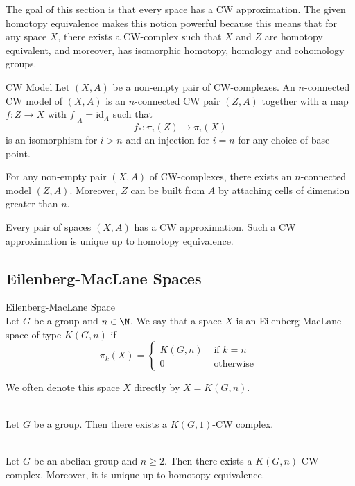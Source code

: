 \documentclass[a4paper]{article}
\begin{document}
The goal of this section is that every space has a CW approximation. The given homotopy equivalence makes this notion powerful because this means that for any space $X$, there exists a CW-complex such that $X$ and $Z$ are homotopy equivalent, and moreover, has isomorphic homotopy, homology and cohomology groups. 

\begin{defn}{CW Model}{} Let $(X,A)$ be a non-empty pair of CW-complexes. An $n$-connected CW model of $(X,A)$ is an $n$-connected CW pair $(Z,A)$ together with a map $f:Z\to X$ with $f|_A=\text{id}_A$ such that $$f_\ast:\pi_i(Z)\to\pi_i(X)$$ is an isomorphism for $i>n$ and an injection for $i=n$ for any choice of base point. 
\end{defn}

\begin{thm}{}{} For any non-empty pair $(X,A)$ of CW-complexes, there exists an $n$-connected model $(Z,A)$. Moreover, $Z$ can be built from $A$ by attaching cells of dimension greater than $n$. 
\end{thm}

\begin{thm}{}{} Every pair of spaces $(X,A)$ has a CW approximation. Such a CW approximation is unique up to homotopy equivalence. 
\end{thm}

\subsection{Eilenberg-MacLane Spaces}
\begin{defn}{Eilenberg-MacLane Space}{}\\
Let $G$ be a group and $n\in\N$. We say that a space $X$ is an Eilenberg-MacLane space of type $K(G,n)$ if $$\pi_k(X)=\begin{cases}
K(G,n) & \text{ if } k=n\\
0 & \text{ otherwise }
\end{cases}$$
\end{defn}

We often denote this space $X$ directly by $X=K(G,n)$. 

\begin{prp}{}{}\\
Let $G$ be a group. Then there exists a $K(G,1)$-CW complex. 
\end{prp}

\begin{prp}{}{}\\
Let $G$ be an abelian group and $n\geq 2$. Then there exists a $K(G,n)$-CW complex. Moreover, it is unique up to homotopy equivalence. 
\end{prp}
\end{document}
